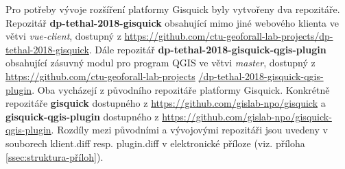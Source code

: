 \newpage
Pro potřeby vývoje rozšíření platformy Gisquick byly vytvořeny dva repozitáře. 
Repozitář \textbf{dp-tethal-2018-gisquick}
obsahující mimo jiné webového klienta ve větvi \textit{vue-client}, dostupný z 
\newline 
\url{https://github.com/ctu-geoforall-lab-projects/dp-tethal-2018-gisquick}. 
Dále repozitář \textbf{dp-tethal-2018-gisquick-qgis-plugin} obsahující zásuvný 
modul pro program QGIS ve větvi \textit{master}, dostupný z  
\newline 
\url{https://github.com/ctu-geoforall-lab-projects} 
\newline 
\url{/dp-tethal-2018-gisquick-qgis-plugin}.
\newline
Oba vycházejí z původního repozitáře platformy Gisquick. Konkrétně 
repozitáře \textbf{gisquick} dostupného z
\newline
\url{https://github.com/gislab-npo/gisquick}
\newline
a \textbf{gisquick-qgis-plugin} dostupného z
\newline
\url{https://github.com/gislab-npo/gisquick-qgis-plugin}.
\newline
Rozdíly mezi původními a vývojovými repozitáři jsou uvedeny v 
souborech klient.diff resp. plugin.diff v elektronické příloze 
(viz. příloha \ref{ssec:struktura-příloh}).

